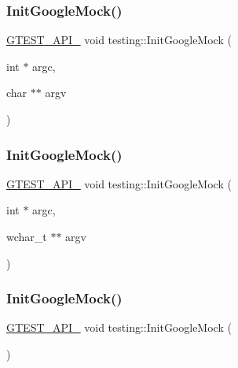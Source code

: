 \subsubsection{\texorpdfstring{InitGoogleMock()}{InitGoogleMock()}\hspace{0.1cm}{\footnotesize\ttfamily [1/3]}}
{\footnotesize\ttfamily \mbox{\hyperlink{_obj__test_2lib_2googletest-release-1_88_81_2googletest_2include_2gtest_2internal_2gtest-port_8h_aa73be6f0ba4a7456180a94904ce17790}{G\+T\+E\+S\+T\+\_\+\+A\+P\+I\+\_\+}} void testing\+::\+Init\+Google\+Mock (\begin{DoxyParamCaption}\item[{int $\ast$}]{argc,  }\item[{char $\ast$$\ast$}]{argv }\end{DoxyParamCaption})}

\mbox{\label{namespacetesting_a20fb86152763dddef67bc1dd8b090800}} 
\subsubsection{\texorpdfstring{InitGoogleMock()}{InitGoogleMock()}\hspace{0.1cm}{\footnotesize\ttfamily [2/3]}}
{\footnotesize\ttfamily \mbox{\hyperlink{_obj__test_2lib_2googletest-release-1_88_81_2googletest_2include_2gtest_2internal_2gtest-port_8h_aa73be6f0ba4a7456180a94904ce17790}{G\+T\+E\+S\+T\+\_\+\+A\+P\+I\+\_\+}} void testing\+::\+Init\+Google\+Mock (\begin{DoxyParamCaption}\item[{int $\ast$}]{argc,  }\item[{wchar\+\_\+t $\ast$$\ast$}]{argv }\end{DoxyParamCaption})}

\mbox{\label{namespacetesting_a9276d4bc746722cb4fe99415c1dc778f}} 
\subsubsection{\texorpdfstring{InitGoogleMock()}{InitGoogleMock()}\hspace{0.1cm}{\footnotesize\ttfamily [3/3]}}
{\footnotesize\ttfamily \mbox{\hyperlink{_obj__test_2lib_2googletest-release-1_88_81_2googletest_2include_2gtest_2internal_2gtest-port_8h_aa73be6f0ba4a7456180a94904ce17790}{G\+T\+E\+S\+T\+\_\+\+A\+P\+I\+\_\+}} void testing\+::\+Init\+Google\+Mock (\begin{DoxyParamCaption}{ }\end{DoxyParamCaption})}

